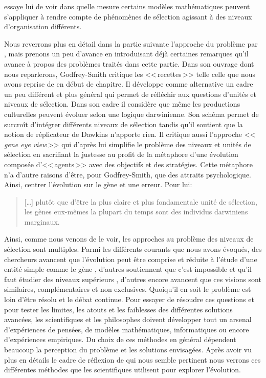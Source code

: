 \cite{okasha2006evolutionandthelevelsofselection} essaye lui de voir dans quelle mesure certains modèles mathématiques peuvent s'appliquer à rendre compte de phénomènes de sélection agissant à des niveaux d'organisation différents.

Nous reverrons plus en détail dans la partie suivante l'approche du problème par \cite{godfrey2009darwinian}, mais prenons un peu d'avance en introduisant déjà certaines remarques qu'il avance à propos des problèmes traités dans cette partie. Dans son ouvrage dont nous reparlerons, Godfrey-Smith critique les <<\,recettes\,>> telle celle que nous avons reprise de \cite{lewontin70unitsselection} en début de chapitre. Il développe comme alternative un cadre un peu différent et plus général qui permet de réfléchir aux questions d'unités et niveaux de sélection. Dans son cadre il considère que même les productions culturelles \citep[p.~147]{godfrey2009darwinian} peuvent évoluer selon une logique darwinienne. Son schéma permet de surcroît d'intégrer différents niveaux de sélection tandis qu'il soutient que la notion de réplicateur de Dawkins n'apporte rien. Il critique aussi l'approche <<\,\emph{gene eye view}\,>> \citep[pp.~129-145]{godfrey2009darwinian} qui d'après lui simplifie le problème des niveaux et unités de sélection en sacrifiant la justesse au profit de la métaphore d'une évolution composée d'<<\,agents\,>> avec des objectifs et des stratégies. Cette métaphore n'a d'autre raisons d'être, pour Godfrey-Smith, que des attraits psychologique. Ainsi, centrer l'évolution sur le gène et une erreur. Pour lui:
\begin{quotation}
	[\ldots] plutôt que d'être la plus claire et plus fondamentale unité de sélection, les gènes eux-mêmes la plupart du temps sont des individus darwiniens marginaux.
	\citep[p.~145]{godfrey2009darwinian}
\end{quotation}

Ainsi, comme nous venons de le voir, les approches au problème des niveaux de sélection sont multiples. Parmi les différents courants que nous avons évoqués, des chercheurs avancent que l'évolution peut être comprise et réduite à l'étude d'une entité simple comme le gène \citep{dawkins76selfishgene,dennett95darwinsdangerousideaevolutionmeaningslife}, d'autres soutiennent que c'est impossible et qu'il faut étudier des niveaux supérieurs \citep{gould2002thestructureofevolutionarytheory,wilson1989revivingsuperorganism,bouchard2009understandingcolonialtraitsusingsymbiosisresearchandecosystemecology}, d'autres encore avancent que ces visions sont similaires, complémentaires et non exclusives. Quoiqu'il en soit le problème est loin d'être résolu et le débat continue. 
Pour essayer de résoudre ces questions et pour tester les limites, les atouts et les faiblesses des différentes solutions avancées, les scientifiques et les philosophes doivent développer tout un arsenal d'expériences de pensées, de modèles mathématiques, informatiques ou encore d'expériences empiriques. Du choix de ces méthodes en général dépendent beaucoup la perception du problème et les solutions envisagées. Après avoir vu plus en détails le cadre de réflexion de \cite{godfrey2009darwinian} qui nous semble pertinent nous verrons ces différentes méthodes que les scientifiques utilisent pour explorer l'évolution.

